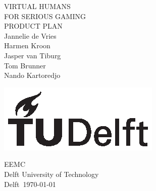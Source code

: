 \documentclass[]{article}
\begin{document}
	
	\begin{titlepage}
		\centering
		
		{\Huge VIRTUAL HUMANS}\\[1em]
		{\huge FOR SERIOUS GAMING}\\[1em]
		{\Large PRODUCT PLAN}\\[2em]
		{Jannelie de Vries}\\
		{Harmen Kroon}\\
		{Jasper van Tiburg}\\
		{Tom Brunner}\\
		{Nando Kartoredjo}
		
		\vfill
		
		\includegraphics{TU_Delft_logo_Black.eps}
		
		EEMC\\
		Delft University of Technology\\
		Delft\
		\today		
	\end{titlepage}
	
	\tableofcontents
	\newpage
	
	
	
	
	
	

	
\end{document}
